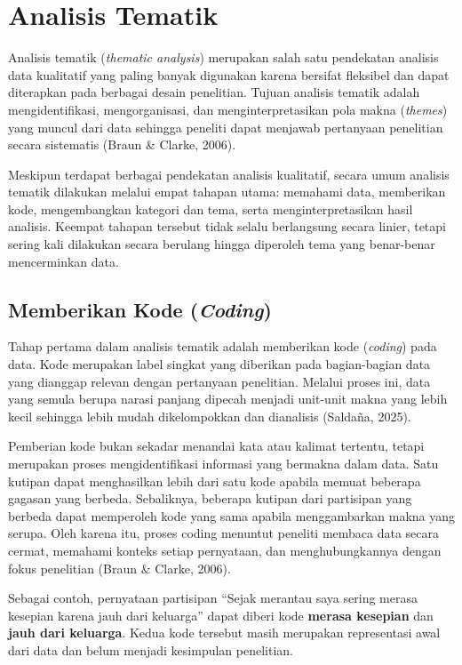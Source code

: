 \documentclass[
  indonesian,
  letterpaper,
  DIV=11,
  numbers=noendperiod]{scrreprt}
\begin{document}
\section{Analisis Tematik}\label{analisis-tematik}

Analisis tematik (\emph{thematic analysis}) merupakan salah satu
pendekatan analisis data kualitatif yang paling banyak digunakan karena
bersifat fleksibel dan dapat diterapkan pada berbagai desain penelitian.
Tujuan analisis tematik adalah mengidentifikasi, mengorganisasi, dan
menginterpretasikan pola makna (\emph{themes}) yang muncul dari data
sehingga peneliti dapat menjawab pertanyaan penelitian secara sistematis
(Braun \& Clarke, 2006).

Meskipun terdapat berbagai pendekatan analisis kualitatif, secara umum
analisis tematik dilakukan melalui empat tahapan utama: memahami data,
memberikan kode, mengembangkan kategori dan tema, serta
menginterpretasikan hasil analisis. Keempat tahapan tersebut tidak
selalu berlangsung secara linier, tetapi sering kali dilakukan secara
berulang hingga diperoleh tema yang benar-benar mencerminkan data.

\subsection{\texorpdfstring{Memberikan Kode
(\emph{Coding})}{Memberikan Kode (Coding)}}\label{memberikan-kode-coding}

Tahap pertama dalam analisis tematik adalah memberikan kode
(\emph{coding}) pada data. Kode merupakan label singkat yang diberikan
pada bagian-bagian data yang dianggap relevan dengan pertanyaan
penelitian. Melalui proses ini, data yang semula berupa narasi panjang
dipecah menjadi unit-unit makna yang lebih kecil sehingga lebih mudah
dikelompokkan dan dianalisis (Saldaña, 2025).

Pemberian kode bukan sekadar menandai kata atau kalimat tertentu, tetapi
merupakan proses mengidentifikasi informasi yang bermakna dalam data.
Satu kutipan dapat menghasilkan lebih dari satu kode apabila memuat
beberapa gagasan yang berbeda. Sebaliknya, beberapa kutipan dari
partisipan yang berbeda dapat memperoleh kode yang sama apabila
menggambarkan makna yang serupa. Oleh karena itu, proses coding menuntut
peneliti membaca data secara cermat, memahami konteks setiap pernyataan,
dan menghubungkannya dengan fokus penelitian (Braun \& Clarke, 2006).

Sebagai contoh, pernyataan partisipan ``Sejak merantau saya sering
merasa kesepian karena jauh dari keluarga'' dapat diberi kode
\textbf{merasa kesepian} dan \textbf{jauh dari keluarga}. Kedua kode
tersebut masih merupakan representasi awal dari data dan belum menjadi
kesimpulan penelitian.
\end{document}
